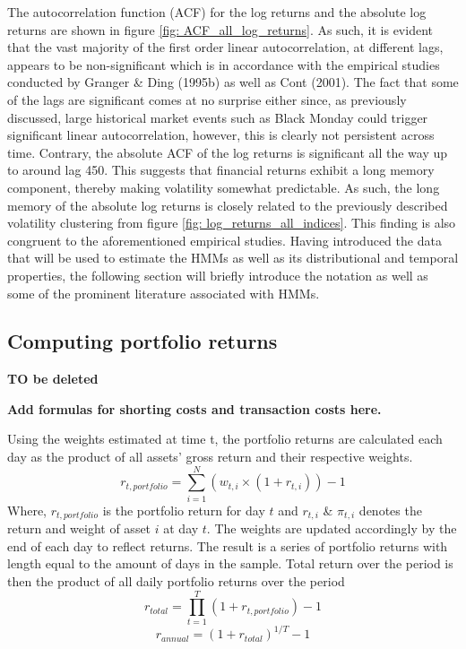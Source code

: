 The autocorrelation function (ACF) for the log returns and the absolute log returns are shown in figure \ref{fig: ACF_all_log_returns}. As such, it is evident that the vast majority of the first order linear autocorrelation, at different lags, appears to be non-significant which is in accordance with the empirical studies conducted by Granger \& Ding (1995b) as well as Cont (2001). The fact that some of the lags are significant comes at no surprise either since, as previously discussed, large historical market events such as Black Monday could trigger significant linear autocorrelation, however, this is clearly not persistent across time. Contrary, the absolute ACF of the log returns is significant all the way up to around lag 450. This suggests that financial returns exhibit a long memory component, thereby making volatility somewhat predictable. As such, the long memory of the absolute log returns is closely related to the previously described volatility clustering from figure \ref{fig: log_returns_all_indices}. This finding is also congruent to the aforementioned empirical studies. Having introduced the data that will be used to estimate the HMMs as well as its distributional and temporal properties, the following section will briefly introduce the notation as well as some of the prominent literature associated with HMMs.

\subsection{Computing portfolio returns}

\textbf{TO be deleted}

\textbf{Add formulas for shorting costs and transaction costs here.}

Using the weights estimated at time t, the portfolio returns are calculated each day as the product of all assets' gross return and their respective weights.
\begin{equation}
    r_{t,portfolio} = \sum_{i=1}^N \left(w_{t,i}\times(1+r_{t,i})\right)  - 1
\end{equation}
Where, $r_{t,portfolio}$ is the portfolio return for day $t$ and $r_{t,i}$ \& $\pi_{t,i}$ denotes the return and weight of asset $i$ at day $t$. The weights are updated accordingly by the end of each day to reflect returns. The result is a series of portfolio returns with length equal to the amount of days in the sample. Total return over the period is then the product of all daily portfolio returns over the period
\begin{equation}
    r_{total} = \prod_{t=1}^T (1+r_{t, portfolio} ) - 1
    \label{eq:total_ret}
\end{equation}
\begin{equation}
    r_{annual}=(1+r_{total})^{1/T}-1
    \label{eq:annual_ret}
\end{equation}

